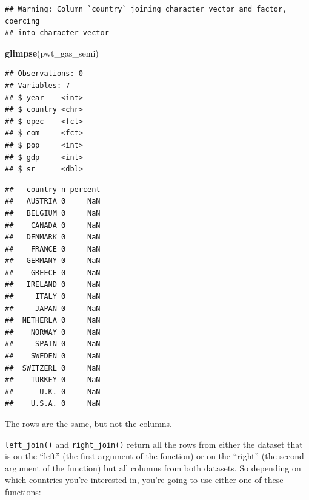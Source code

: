 \documentclass[]{gitbook}
\newenvironment{Shaded}{\begin{snugshade}}{\end{snugshade}}
\newcommand{\DataTypeTok}[1]{\textcolor[rgb]{0.13,0.29,0.53}{#1}}
\newcommand{\KeywordTok}[1]{\textcolor[rgb]{0.13,0.29,0.53}{\textbf{#1}}}
\newcommand{\NormalTok}[1]{#1}
\newcommand{\OperatorTok}[1]{\textcolor[rgb]{0.81,0.36,0.00}{\textbf{#1}}}
\newcommand{\StringTok}[1]{\textcolor[rgb]{0.31,0.60,0.02}{#1}}
\theoremstyle{definition}
\theoremstyle{definition}
\theoremstyle{definition}
\theoremstyle{remark}
\begin{document}
\begin{Shaded}
\end{Shaded}

\begin{verbatim}
## Warning: Column `country` joining character vector and factor, coercing
## into character vector
\end{verbatim}

\begin{Shaded}
\begin{Highlighting}[]
\KeywordTok{glimpse}\NormalTok{(pwt_gas_semi)}
\end{Highlighting}
\end{Shaded}

\begin{verbatim}
## Observations: 0
## Variables: 7
## $ year    <int> 
## $ country <chr> 
## $ opec    <fct> 
## $ com     <fct> 
## $ pop     <int> 
## $ gdp     <int> 
## $ sr      <dbl>
\end{verbatim}

\begin{Shaded}
\end{Shaded}

\begin{verbatim}
##   country n percent
##   AUSTRIA 0     NaN
##   BELGIUM 0     NaN
##    CANADA 0     NaN
##   DENMARK 0     NaN
##    FRANCE 0     NaN
##   GERMANY 0     NaN
##    GREECE 0     NaN
##   IRELAND 0     NaN
##     ITALY 0     NaN
##     JAPAN 0     NaN
##  NETHERLA 0     NaN
##    NORWAY 0     NaN
##     SPAIN 0     NaN
##    SWEDEN 0     NaN
##  SWITZERL 0     NaN
##    TURKEY 0     NaN
##      U.K. 0     NaN
##    U.S.A. 0     NaN
\end{verbatim}

The rows are the same, but not the columns.

\texttt{left\_join()} and \texttt{right\_join()} return all the rows
from either the dataset that is on the ``left'' (the first argument of
the fonction) or on the ``right'' (the second argument of the function)
but all columns from both datasets. So depending on which countries
you're interested in, you're going to use either one of these functions:
\end{document}
